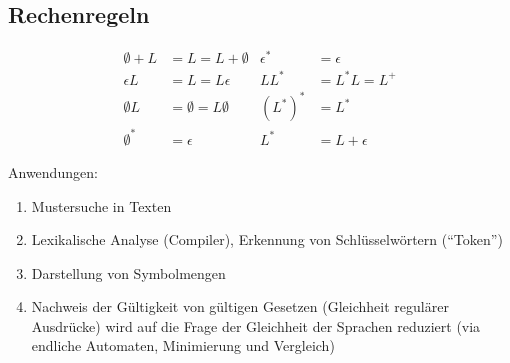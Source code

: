 \subsection{Rechenregeln}
\begin{align*}
	\emptyset + L &= L = L + \emptyset 		&  \epsilon^* &= \epsilon\\
	\epsilon L &= L = L\epsilon 				& LL^* &= L^*L = L^+\\
	\emptyset L & = \emptyset = L \emptyset 	& (L^*)^* &= L^*\\
	\emptyset^* &= \epsilon & L^* 				&= L + \epsilon
\end{align*}

Anwendungen:
\begin{enumerate}\itemsep0em
	\item Mustersuche in Texten
	\item Lexikalische Analyse (Compiler), Erkennung von Schlüsselwörtern (\enquote{Token})
	\item Darstellung von Symbolmengen
	\item Nachweis der Gültigkeit von gültigen Gesetzen (Gleichheit regulärer Ausdrücke) wird
	auf die Frage der Gleichheit der Sprachen reduziert (via endliche Automaten, Minimierung und Vergleich)
\end{enumerate}


